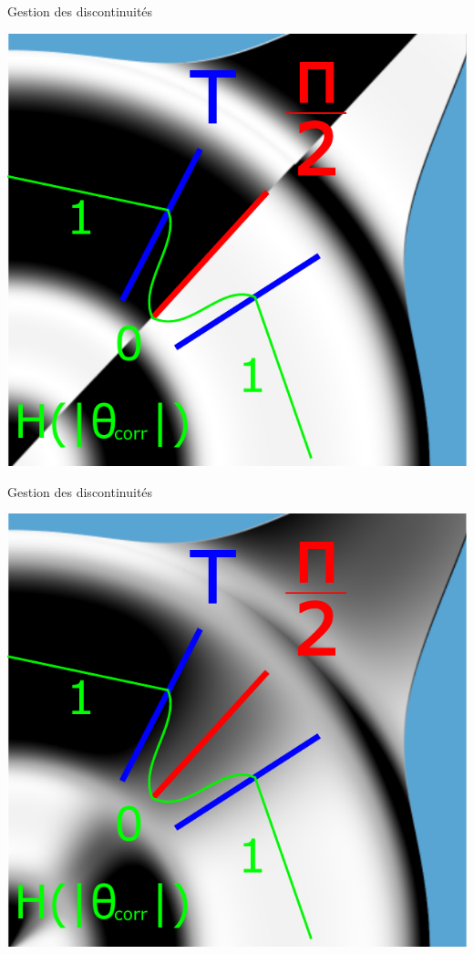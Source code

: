 \documentclass{beamer}
\begin{document}
\begin{frame}{Gestion des discontinuités}

\begin{center}
\includegraphics[width=0.6\linewidth]{Schema/orientationTheta_Image_discontinue_3.pdf}
\end{center}
	


\end{frame}


\begin{frame}{Gestion des discontinuités}

\begin{center}
\includegraphics[width=0.6\linewidth]{Schema/orientationTheta_Image_discontinue_4.pdf}
\end{center}

	

\end{frame}
\end{document}
